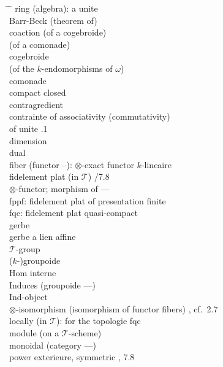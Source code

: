 \documentclass[12pt,a4paper]{article}
\theoremstyle{plain}
\theoremstyle{definition}
\begin{document}
\begin{tabbing}
\hspace{3cm} \= \hspace{3cm} \= \kill
ring (algebra): a unite \>  \\[4pt]
Barr-Beck (theorem of) \>  \\[4pt]
coaction (of a cogebroide) \>  \\
\> (of a comonade)  \\[4pt]
cogebroide \>  \\
\> (of the $k$-endomorphisms of $\omega$)  \\[4pt]
comonade \>  \\[4pt]
compact closed \>  \\[4pt]
contragredient \>  \\[4pt]
contrainte of associativity (commutativity) \>  \\[4pt]
\> of unite .1 \\[4pt]
dimension \>  \\[4pt]
dual \>  \\[4pt]
fiber (functor --): $\otimes$-exact functor $k$-lineaire \>  \\
\> fidelement plat (in $\mathcal{T}$) /7.8 \\[4pt]
$\otimes$-functor; morphism of --- \>  \\[4pt]
fppf: fidelement plat of presentation finite \> \> \\
fqc: fidelement plat quasi-compact \> \> \\[4pt]
gerbe \>  \\
gerbe a lien affine \>  \\
$\mathcal{T}$-group \>  \\
($k$-)groupoide \>  \\[4pt]
Hom interne \>  \\[4pt]
Induces (groupoide ---) \>  \\
Ind-object \>  \\[4pt]
$\otimes$-isomorphism (isomorphism of functor fibers) \> , cf.~2.7 \\
locally (in $\mathcal{T}$): for the topologie fqc \>  \\
module (on a $\mathcal{T}$-scheme) \>  \\
monoidal (category ---) \>  \\[4pt]
power exterieure, symmetric \> , 7.8 \\

\end{tabbing}
\end{document}
